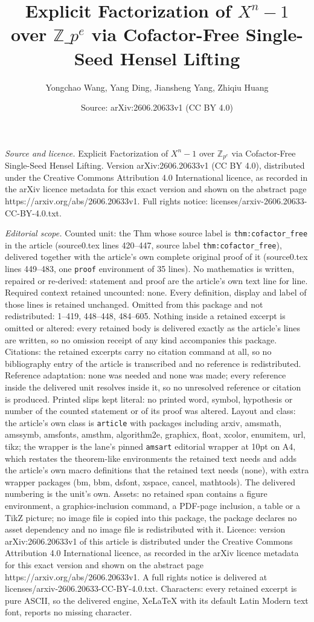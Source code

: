 \documentclass[10pt,a4paper]{amsart}
\title[Explicit Factorization of $X^n-1$ over $\mathbb{Z}\_{p^e}$ vi]{Explicit Factorization of $X^n-1$ over $\mathbb{Z}\_{p^e}$ via Cofactor-Free Single-Seed Hensel Lifting}
\author{Yongchao Wang, Yang Ding, Jiansheng Yang, Zhiqiu Huang}
\date{Source: arXiv:2606.20633v1 (CC BY 4.0)}
\begin{document}
\maketitle

\noindent\emph{Source and licence.} Explicit Factorization of $X^n-1$ over $\mathbb{Z}_{p^e}$ via Cofactor-Free Single-Seed Hensel Lifting. Version arXiv:2606.20633v1 (CC BY 4.0), distributed under the Creative Commons Attribution 4.0 International licence, as recorded in the arXiv licence metadata for this exact version and shown on the abstract page https://arxiv.org/abs/2606.20633v1. Full rights notice: licenses/arxiv-2606.20633-CC-BY-4.0.txt.\par\smallskip

\noindent\textit{Editorial scope.} Counted unit: the Thm whose source label is \texttt{thm:cofactor\_free} in the article (source0.tex lines 420--447, source label \texttt{thm:cofactor\_free}), delivered together with the article's own complete original proof of it (source0.tex lines 449--483, one \texttt{proof} environment of 35 lines). No mathematics is written, repaired or re-derived: statement and proof are the article's own text line for line. Required context retained uncounted: none. Every definition, display and label of those lines is retained unchanged. Omitted from this package and not redistributed: 1--419, 448--448, 484--605. Nothing inside a retained excerpt is omitted or altered: every retained body is delivered exactly as the article's lines are written, so no omission receipt of any kind accompanies this package. Citations: the retained excerpts carry no citation command at all, so no bibliography entry of the article is transcribed and no reference is redistributed. Reference adaptation: none was needed and none was made; every reference inside the delivered unit resolves inside it, so no unresolved reference or citation is produced. Printed slips kept literal: no printed word, symbol, hypothesis or number of the counted statement or of its proof was altered. Layout and class: the article's own class is \texttt{article} with packages including arxiv, amsmath, amssymb, amsfonts, amsthm, algorithm2e, graphicx, float, xcolor, enumitem, url, tikz; the wrapper is the lane's pinned \texttt{amsart} editorial wrapper at 10pt on A4, which restates the theorem-like environments the retained text needs and adds the article's own macro definitions that the retained text needs (none), with extra wrapper packages (bm, bbm, dsfont, xspace, cancel, mathtools). The delivered numbering is the unit's own. Assets: no retained span contains a figure environment, a graphics-inclusion command, a PDF-page inclusion, a table or a TikZ picture; no image file is copied into this package, the package declares no asset dependency and no image file is redistributed with it. Licence: version arXiv:2606.20633v1 of this article is distributed under the Creative Commons Attribution 4.0 International licence, as recorded in the arXiv licence metadata for this exact version and shown on the abstract page https://arxiv.org/abs/2606.20633v1. A full rights notice is delivered at licenses/arxiv-2606.20633-CC-BY-4.0.txt. Characters: every retained excerpt is pure ASCII, so the delivered engine, XeLaTeX with its default Latin Modern text font, reports no missing character.
\end{document}
